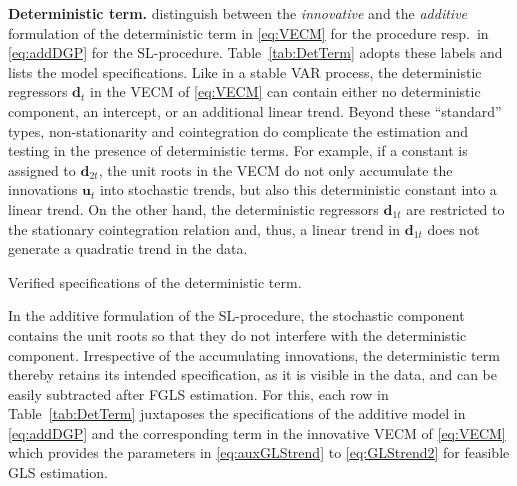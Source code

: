\textbf{Deterministic term.} \citet{JohansenNielsen2018} distinguish between the \textit{innovative} and the \textit{additive} formulation of the deterministic term in \eqref{eq:VECM} for the \citeauthor{Johansen1996} procedure resp.~in \eqref{eq:addDGP} for the SL-procedure. Table~\ref{tab:DetTerm} adopts these labels and lists the model specifications. Like in a stable VAR process, the deterministic regressors $\boldsymbol{d}_t $ in the VECM of \eqref{eq:VECM} can contain either no deterministic component, an intercept, or an additional linear trend. Beyond these ``standard'' types, non-stationarity and cointegration do complicate the estimation and testing in the presence of deterministic terms. For example, if a constant is assigned to $ \boldsymbol{d}_{2t} $, the unit roots in the VECM do not only accumulate the innovations $ \boldsymbol{u}_t $ into stochastic trends, but also this deterministic constant into a linear trend. On the other hand, the deterministic regressors $ \boldsymbol{d}_{1t} $ are restricted to the stationary cointegration relation and, thus, a linear trend in $ \boldsymbol{d}_{1t} $ does not generate a quadratic trend in the data. 
\begin{table}[ht]	%
	\centering
	\caption{Verified specifications of the deterministic term.}
	\resizebox{\textwidth}{!}{
		}
	\label{tab:DetTerm}		
\end{table}
In the additive formulation of the SL-procedure, the stochastic component contains the unit roots so that they do not interfere with the deterministic component. Irrespective of the accumulating innovations, the deterministic term thereby retains its intended specification, as it is visible in the data, and can be easily subtracted after FGLS estimation. For this, each row in Table~\ref{tab:DetTerm} juxtaposes the specifications of the additive model in \eqref{eq:addDGP} and the corresponding term in the innovative VECM of \eqref{eq:VECM} which provides the parameters in \eqref{eq:auxGLStrend} to \eqref{eq:GLStrend2} for feasible GLS estimation.

